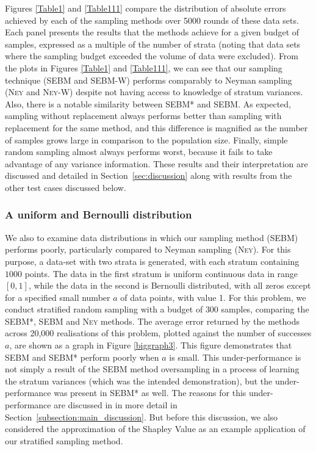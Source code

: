 Figures \ref{Table1} and \ref{Table111} compare the distribution of absolute errors achieved by each of the sampling methods over 5000 rounds of these data sets.
Each panel presents the results that the methods achieve for a given budget of samples, 
expressed as a multiple of the number of strata (noting that data sets where the sampling budget exceeded the volume of data were excluded).
From the plots in Figures \ref{Table1} and \ref{Table111}, we can see that our sampling technique (SEBM and SEBM-W) performs comparably to
Neyman sampling (\textsc{Ney} and \textsc{Ney-W}) despite not having access to knowledge of stratum variances.
Also, there is a notable similarity between SEBM* and SEBM.
As expected, sampling without replacement always performs better than sampling with replacement for the same method, and this difference is magnified as the number of samples grows large in comparison to the population size. 
Finally, simple random sampling almost always performs worst, because it fails to take advantage of any variance information.
These results and their interpretation are discussed and detailed in Section~\ref{sec:discussion} along with results from the other test cases discussed below.



\subsubsection{A uniform and Bernoulli distribution}
\label{sec:dataset2}
We also to examine data distributions in which our sampling method (SEBM) performs poorly, particularly compared to Neyman sampling (\textsc{Ney}).
For this purpose, a data-set with two strata is generated, with each stratum containing $1000$ points. 
The data in the first stratum is uniform continuous data in range $[0,1]$, while the data in the second is Bernoulli distributed, with all zeros except for a specified small number $a$ of data points, with value 1.
For this problem, we conduct stratified random sampling with a budget of $300$ samples, comparing the SEBM*, SEBM and \textsc{Ney} methods.
The average error returned by the methods across 20,000 realisations of this problem, plotted against the number of successes $a$, are shown as a graph in Figure \ref{biggraph3}.
This figure demonstrates that SEBM and SEBM* perform poorly when $a$ is small.
This under-performance is not simply a result of the SEBM method oversampling in a process of learning the stratum variances (which was the intended demonstration), but the under-performance was present in SEBM* as well.
The reasons for this under-performance are discussed in in more detail in Section~\ref{subsection:main_discussion}.
But before this discussion, we also considered the approximation of the Shapley Value as an example application of our stratified sampling method.












